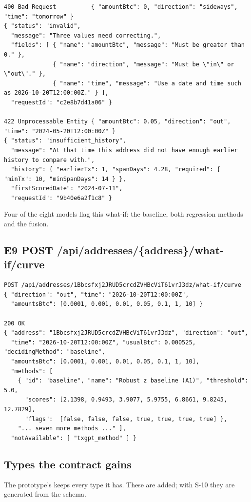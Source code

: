 \begin{lstlisting}[style=json]
400 Bad Request          { "amountBtc": 0, "direction": "sideways", "time": "tomorrow" }
{ "status": "invalid",
  "message": "Three values need correcting.",
  "fields": [ { "name": "amountBtc", "message": "Must be greater than 0." },
              { "name": "direction", "message": "Must be \"in\" or \"out\"." },
              { "name": "time", "message": "Use a date and time such as 2026-10-20T12:00:00Z." } ],
  "requestId": "c2e8b7d41a06" }

422 Unprocessable Entity { "amountBtc": 0.05, "direction": "out", "time": "2024-05-20T12:00:00Z" }
{ "status": "insufficient_history",
  "message": "At that time this address did not have enough earlier history to compare with.",
  "history": { "earlierTx": 1, "spanDays": 4.28, "required": { "minTx": 10, "minSpanDays": 14 } },
  "firstScoredDate": "2024-07-11",
  "requestId": "9b40e6a2f1c8" }
\end{lstlisting}

Four of the eight models flag this what-if: the baseline, both regression methods and the fusion.

\subsection{E9 \quad POST /api/addresses/\{address\}/what-if/curve}

\begin{lstlisting}[style=json]
POST /api/addresses/1Bbcsfxj2JRUD5crcdZVHBcViT61vrJ3dz/what-if/curve
{ "direction": "out", "time": "2026-10-20T12:00:00Z",
  "amountsBtc": [0.0001, 0.001, 0.01, 0.05, 0.1, 1, 10] }

200 OK
{ "address": "1Bbcsfxj2JRUD5crcdZVHBcViT61vrJ3dz", "direction": "out",
  "time": "2026-10-20T12:00:00Z", "usualBtc": 0.000525, "decidingMethod": "baseline",
  "amountsBtc": [0.0001, 0.001, 0.01, 0.05, 0.1, 1, 10],
  "methods": [
    { "id": "baseline", "name": "Robust z baseline (A1)", "threshold": 5.0,
      "scores": [2.1398, 0.9493, 3.9077, 5.9755, 6.8661, 9.8245, 12.7829],
      "flags":  [false, false, false, true, true, true, true] },
    "... seven more methods ..." ],
  "notAvailable": [ "txgpt_method" ] }
\end{lstlisting}

\subsection{Types the contract gains}

The prototype's  keeps every type it has. These are added; with S-10 they are
generated from the schema.

